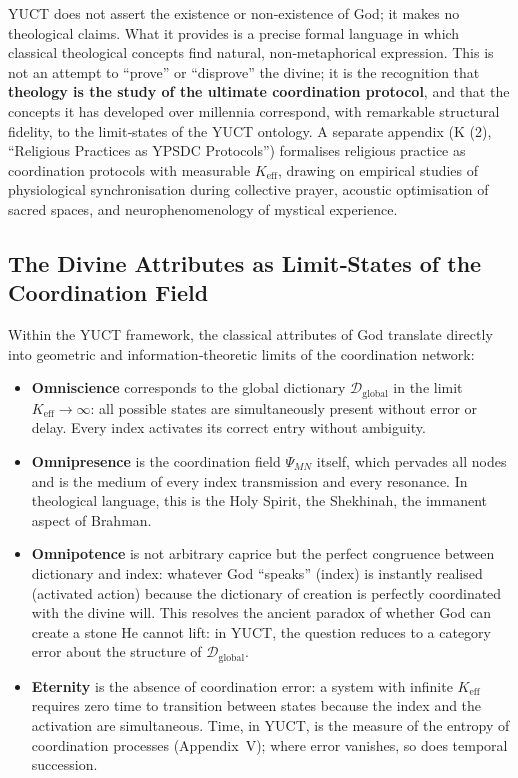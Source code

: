 \documentclass[12pt,a4paper]{article}
\begin{document}
	YUCT does not assert the existence or non‑existence of God; it makes no theological claims. What it provides is a precise formal language in which classical theological concepts find natural, non‑metaphorical expression. This is not an attempt to “prove” or “disprove” the divine; it is the recognition that \textbf{theology is the study of the ultimate coordination protocol}, and that the concepts it has developed over millennia correspond, with remarkable structural fidelity, to the limit‑states of the YUCT ontology. A separate appendix (K (2), “Religious Practices as YPSDC Protocols”) formalises religious practice as coordination protocols with measurable \(K_{\mathrm{eff}}\), drawing on empirical studies of physiological synchronisation during collective prayer, acoustic optimisation of sacred spaces, and neurophenomenology of mystical experience.
	
	\subsection{The Divine Attributes as Limit‑States of the Coordination Field}
	
	Within the YUCT framework, the classical attributes of God translate directly into geometric and information‑theoretic limits of the coordination network:
	
	\begin{itemize}[leftmargin=*]
		\item \textbf{Omniscience} corresponds to the global dictionary \(\mathcal{D}_{\text{global}}\) in the limit \(K_{\mathrm{eff}} \to \infty\): all possible states are simultaneously present without error or delay. Every index activates its correct entry without ambiguity.
		\item \textbf{Omnipresence} is the coordination field \(\Psi_{MN}\) itself, which pervades all nodes and is the medium of every index transmission and every resonance. In theological language, this is the Holy Spirit, the Shekhinah, the immanent aspect of Brahman.
		\item \textbf{Omnipotence} is not arbitrary caprice but the perfect congruence between dictionary and index: whatever God “speaks” (index) is instantly realised (activated action) because the dictionary of creation is perfectly coordinated with the divine will. This resolves the ancient paradox of whether God can create a stone He cannot lift: in YUCT, the question reduces to a category error about the structure of \(\mathcal{D}_{\text{global}}\).
		\item \textbf{Eternity} is the absence of coordination error: a system with infinite \(K_{\mathrm{eff}}\) requires zero time to transition between states because the index and the activation are simultaneous. Time, in YUCT, is the measure of the entropy of coordination processes (Appendix~V); where error vanishes, so does temporal succession.
	\end{itemize}
	
\end{document}
